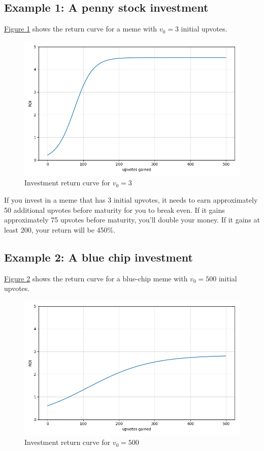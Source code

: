 \documentclass[a4paper, 12pt]{article}
\begin{document}
\subsection*{Example 1: A penny stock investment}
\label{sec:org607330f}

\hyperref[fig:orgfdadd63]{Figure 1} shows the return curve for a meme with \(v_0 = 3\) initial upvotes.

\begin{figure}[H]
\centering
\includegraphics[width=.9\linewidth]{./paper_figure_1.png}
\caption{\label{fig:orgfdadd63}
Investment return curve for \(v_0 = 3\)}
\end{figure}

If you invest in a meme that has 3 initial upvotes, it needs to earn approximately 50
additional upvotes before maturity for you to break even. If it gains
approximately 75 upvotes before maturity, you'll double your money. If it gains
at least 200, your return will be 450\%.

\subsection*{Example 2: A blue chip investment}
\label{sec:org7d006b3}

\hyperref[fig:org3d024c8]{Figure 2} shows the return curve for a blue-chip meme with \(v_0 = 500\)
initial upvotes.

\begin{figure}[H]
\centering
\includegraphics[width=.9\linewidth]{./paper_figure_2.png}
\caption{\label{fig:org3d024c8}
Investment return curve for \(v_0 = 500\)}
\end{figure}
\end{document}
